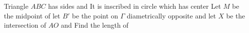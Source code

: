 Triangle $ABC$ has sides   and  It is inscribed in circle  which has center  Let $M$ be the midpoint of  let $B'$ be the point on $\Gamma$ diametrically opposite  and let $X$ be the intersection of $AO$ and  Find the length of 